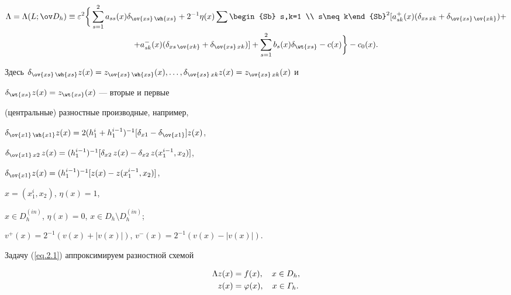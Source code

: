 \begin{multline} \label{eq.3.3^1}


\La=\La(L;\od_h)\equiv\eps^2 \bigg \{\sum_{s=1}^{2}a_{ss}(x)


\de_{\ov{xs}\,\wh{x s}}+2^{-1}\eta(x)\sum\begin{Sb} s,k=1 \\


s\neq k\end{Sb}^{2}


[a_{sk}^{+}(x)(\de_{xs\,xk}+\de_{\ov{xs}\,\ov{xk}})+ \\


%


+a_{sk}^{-}(x)(\de_{xs\,\ov{xk}}+\de_{\ov{xs}\,xk})]+


\sum_{s=1}^{2}b_s(x)\de_{\wt{xs}}-c(x) \bigg \}-c_0(x). 


\end{multline}


Здесь $\de_{\ov{xs}\,\wh{x s}} z(x)=z_{\ov{xs}\,\wh{x s}}(x),


\dotsc,\de_{\ov{xs}\,xk} z(x)=z_{\ov{xs}\,xk}(x)$ и


$\de_{\wt{xs}}z(x)=z_{\wt{xs}}(x)$ --- вторые и первые


(центральные) разностные производные, например,


$\de_{\ov{x1}\,\wh{x1}}z(x)=2(h_1^i+h_1^{i-1})^{-1}


[\de_{x1}-\de_{\ov{x1}}]z(x)$, 


$\de_{\ov{x1}\,x2}\,z(x)= (h_1^{i-1} )^{-1}


[\de_{x2}\,z(x)-\de_{x2}\,z(x_1^{i-1},x_2)]$, 


$\de_{\ov{x1}}z(x)= (h_1^{i-1})^{-1}[z(x)-z(x_1^{i-1},x_2)]$,


$x=(x_1^i,x_2)$, $\eta(x)=1$,


$x\in D_h^{(in)}$, $\eta(x)=0$, $x\in D_h\setminus D_h^{(in)}$;


$v^{+}(x)=2^{-1}(v(x)+|v(x)|)$, $v^{-}(x)=2^{-1}(v(x)-|v(x)|)$.





Задачу (\ref{eq.2.1}) аппроксимируем разностной схемой


\begin{equation}


\begin{split}


\La z(x)&=f(x), \quad x\in D_h, \label{eq.3.4}\\


z(x)&=\vp(x), \quad x\in \varGamma_h.


\end{split}


\end{equation}





